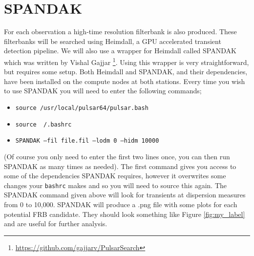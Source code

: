 \documentclass[12pt, onepage]{article}
\numberwithin{equation}{section} %
\begin{document}
\section{SPANDAK}
For each observation a high-time resolution filterbank is also produced. These filterbanks will be searched using Heimdall, a GPU accelerated transient detection pipeline. We will also use a wrapper for Heimdall called SPANDAK which was written by Vishal Gajjar \footnote{\url{https://github.com/gajjarv/PulsarSearch}}. Using this wrapper is very straightforward, but requires some setup. Both Heimdall and SPANDAK, and their dependencies, have been installed on the compute nodes at both stations.  Every time you wish to use SPANDAK you will need to enter the following commands;
\begin{itemize}
    \item \texttt{source /usr/local/pulsar64/pulsar.bash}
    \item \texttt{source ~/.bashrc}
    \item \texttt{SPANDAK --fil file.fil --lodm 0 --hidm 10000}
\end{itemize}
(Of course you only need to enter the first two lines once, you can then run SPANDAK as many times as needed). The first command gives you access to some of the dependencies SPANDAK requires, however it overwrites some changes your \texttt{bashrc} makes and so you will need to source this again. The SPANDAK command given above will look for transients at dispersion measures from 0 to 10,000. SPANDAK will produce a .png file with some plots for each potential FRB candidate. They should look something like Figure \ref{fig:my_label} and are useful for further analysis.
\end{document}
